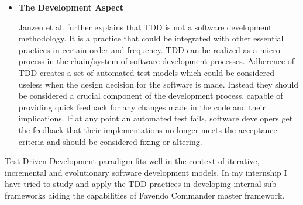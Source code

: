 \begin{itemize}
	\item \textbf{The Development Aspect}
	\par Janzen et al. \cite{janzen2005test} further explains that TDD is not a software development methodology. It is a practice that could be integrated with other essential practices in certain order and frequency. TDD can be realized as a micro-process in the chain/system of software development processes. Adherence of TDD creates a set of automated test models which could be considered useless when the design decision for the software is made. Instead they should be considered a crucial component of the development process, capable of providing quick feedback for any changes made in the code and their implications. If at any point an automated test fails, software developers get the feedback that their implementations no longer meets the acceptance criteria and should be considered fixing or altering.
\end{itemize}
Test Driven Development paradigm fits well in the context of iterative, incremental and evolutionary software development models. In my internship I have tried to study and apply the TDD practices in developing internal sub-frameworks aiding the capabilities of Favendo Commander master framework.

